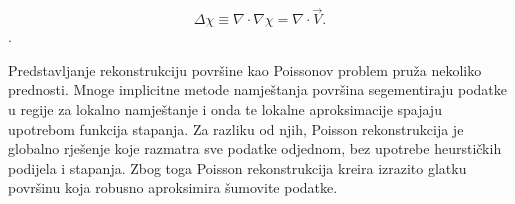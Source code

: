 \begin{equation*}
\Delta \chi \equiv \nabla \cdot \nabla\chi = \nabla \cdot \vec{V}.
\end{equation*}.

Predstavljanje rekonstrukciju površine kao Poissonov problem pruža
nekoliko prednosti. Mnoge implicitne metode namještanja površina
segementiraju podatke u regije za lokalno namještanje i onda te lokalne
aproksimacije spajaju upotrebom funkcija stapanja. Za razliku od njih,
Poisson rekonstrukcija je globalno rješenje koje razmatra sve podatke
odjednom, bez upotrebe heurstičkih podijela i stapanja. Zbog toga
Poisson rekonstrukcija kreira izrazito glatku površinu koja robusno
aproksimira šumovite podatke.  



